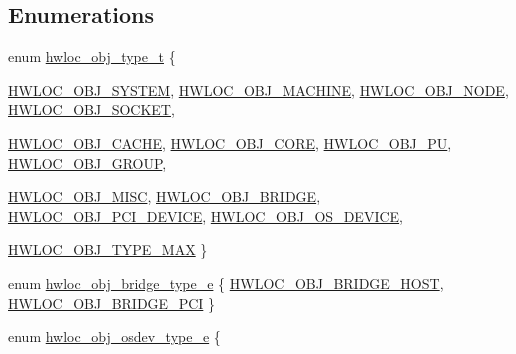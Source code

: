 \subsection*{Enumerations}
\begin{DoxyCompactItemize}
\item 
enum \hyperlink{a00041_gacd37bb612667dc437d66bfb175a8dc55}{hwloc\_\-obj\_\-type\_\-t} \{ \par
\hyperlink{a00041_ggacd37bb612667dc437d66bfb175a8dc55a3aa1b842d1fd4207ebce171f95a244ec}{HWLOC\_\-OBJ\_\-SYSTEM}, 
\hyperlink{a00041_ggacd37bb612667dc437d66bfb175a8dc55a3f4e83ffc4a259354959ae8a9eaa2a80}{HWLOC\_\-OBJ\_\-MACHINE}, 
\hyperlink{a00041_ggacd37bb612667dc437d66bfb175a8dc55aaf0964881117bdedf1a5e9332cd120dd}{HWLOC\_\-OBJ\_\-NODE}, 
\hyperlink{a00041_ggacd37bb612667dc437d66bfb175a8dc55a1ac6e07775ae4324b3fe9dbd72c785ec}{HWLOC\_\-OBJ\_\-SOCKET}, 
\par
\hyperlink{a00041_ggacd37bb612667dc437d66bfb175a8dc55a56ee0b7eca88f363b75b34fdde8c9ddc}{HWLOC\_\-OBJ\_\-CACHE}, 
\hyperlink{a00041_ggacd37bb612667dc437d66bfb175a8dc55ac793958f330bca371aa1535de8aff45f}{HWLOC\_\-OBJ\_\-CORE}, 
\hyperlink{a00041_ggacd37bb612667dc437d66bfb175a8dc55abca6887e80cb291353b0a0c1da83f661}{HWLOC\_\-OBJ\_\-PU}, 
\hyperlink{a00041_ggacd37bb612667dc437d66bfb175a8dc55a5269ef95be72f88465559d35c9b7ad56}{HWLOC\_\-OBJ\_\-GROUP}, 
\par
\hyperlink{a00041_ggacd37bb612667dc437d66bfb175a8dc55a19f8a6953fa91efc76bcbcdf2d22de4d}{HWLOC\_\-OBJ\_\-MISC}, 
\hyperlink{a00041_ggacd37bb612667dc437d66bfb175a8dc55a6825f10895fea60aca7a6ba9fe273db0}{HWLOC\_\-OBJ\_\-BRIDGE}, 
\hyperlink{a00041_ggacd37bb612667dc437d66bfb175a8dc55a5d8117a54df1fbd3606ab19e42cb0ea9}{HWLOC\_\-OBJ\_\-PCI\_\-DEVICE}, 
\hyperlink{a00041_ggacd37bb612667dc437d66bfb175a8dc55a51e7280240fd9f25589cbbe538bdb075}{HWLOC\_\-OBJ\_\-OS\_\-DEVICE}, 
\par
\hyperlink{a00041_ggacd37bb612667dc437d66bfb175a8dc55addb5f843e1812445a84e6b2a844b1ebc}{HWLOC\_\-OBJ\_\-TYPE\_\-MAX}
 \}
\item 
enum \hyperlink{a00041_ga48a4803c72574191d7ead1c62aaf9860}{hwloc\_\-obj\_\-bridge\_\-type\_\-e} \{ \hyperlink{a00041_gga48a4803c72574191d7ead1c62aaf9860a2c7660f3864ad2810c1e72aad285e574}{HWLOC\_\-OBJ\_\-BRIDGE\_\-HOST}, 
\hyperlink{a00041_gga48a4803c72574191d7ead1c62aaf9860a8f3b4cecf3dab6073d74696d10863c60}{HWLOC\_\-OBJ\_\-BRIDGE\_\-PCI}
 \}
\item 
enum \hyperlink{a00041_ga64f5d539df299c97ae80ce53fc4b56c0}{hwloc\_\-obj\_\-osdev\_\-type\_\-e} \{ \par

\end{DoxyCompactItemize}
